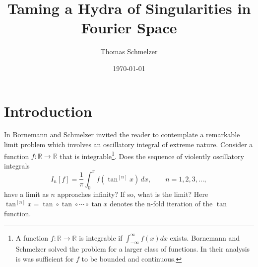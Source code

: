\documentclass{amsart}
\theoremstyle{plain}
\numberwithin{equation}{section}
\newcommand{\R}{{\mathbb  R}}
\begin{document}
\title[A Hydra in Fourier Space]{Taming a Hydra of Singularities in Fourier Space}
\author{Thomas Schmelzer}
\address[]
{Thomas Schmelzer \newline
\indent Winton Capital Management \newline
\indent Magdalen Centre, The Oxford Science Park, Oxford OX4 4GA, UK
}

%
\date{\today}

\maketitle


\section{Introduction}
In \cite{BornemannSchmelzer} Bornemann and Schmelzer invited the reader to contemplate
a remarkable limit problem which involves an oscillatory integral of extreme nature.
Consider a function $f: \R \to \R$ that is integrable\footnote{A function $f: \R \to \R$ is integrable if $\int_{-\infty}^\infty f(x) dx$ exists. Bornemann and Schmelzer solved the problem for a larger class of functions. In their analysis is was sufficient for $f$ to be bounded and continuous. }. 
Does the sequence of violently oscillatory integrals
\begin{equation}\label{eq1}
I_n[f] = \frac{1}{\pi}\int_0^\pi f(\tan^{[n]}x)\,dx, \qquad n=1,2,3,\ldots,
\end{equation}
have a limit as $n$ approaches infinity? If so, what is the limit?
Here $\tan^{[n]}x = \tan \circ \tan \circ \cdots \circ \tan x$ denotes the n-fold iteration of the $\tan$ function. 
\end{document}
